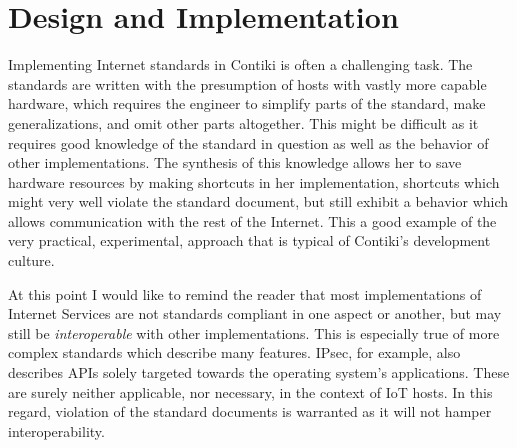 \documentclass[final,a4paper,twoside,11pt,onecolumn]{report}
\begin{document}








\chapter{Design and Implementation}
\label{cha:doi}

Implementing Internet standards in Contiki is often a challenging task. The standards are written with the presumption of hosts with vastly more capable hardware, which requires the engineer to simplify parts of the standard, make generalizations, and omit other parts altogether. This might be difficult as it requires good knowledge of the standard in question as well as the behavior of other implementations. The synthesis of this knowledge allows her to save hardware resources by making shortcuts in her implementation, shortcuts which might very well violate the standard document, but still exhibit a behavior which allows communication with the rest of the Internet. This a good example of the very practical, experimental, approach that is typical of Contiki's development culture.

At this point I would like to remind the reader that most implementations of Internet Services are not standards compliant in one aspect or another, but may still be \emph{interoperable} with other implementations. This is especially true of more complex standards which describe many features. IPsec, for example, also describes APIs solely targeted towards the operating system's applications. These are surely neither applicable, nor necessary, in the context of IoT hosts. In this regard, violation of the standard documents is warranted as it will not hamper interoperability.

\end{document}
